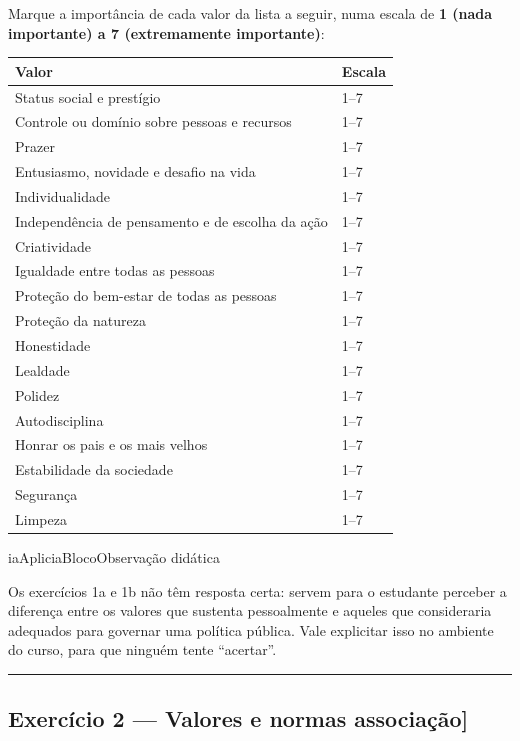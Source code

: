 \documentclass[
  11pt,
]{article}
\renewcommand{\texttt}[1]{{\color{iaAmeixa}\small\ttfamily #1}}
\newenvironment{reflexao}[1][Para pensar]{\begin{iabox}{iaAplic}{iaBloco}{#1}}{\end{iabox}}
\begin{document}
Marque a importância de cada valor da lista a seguir, numa escala de
\textbf{1 (nada importante) a 7 (extremamente importante)}:

\begin{longtable}[]{@{}ll@{}}
\toprule\noalign{}
Valor & Escala \\
\midrule\noalign{}
\endhead
\bottomrule\noalign{}
\endlastfoot
Status social e prestígio & 1--7 \\
Controle ou domínio sobre pessoas e recursos & 1--7 \\
Prazer & 1--7 \\
Entusiasmo, novidade e desafio na vida & 1--7 \\
Individualidade & 1--7 \\
Independência de pensamento e de escolha da ação & 1--7 \\
Criatividade & 1--7 \\
Igualdade entre todas as pessoas & 1--7 \\
Proteção do bem-estar de todas as pessoas & 1--7 \\
Proteção da natureza & 1--7 \\
Honestidade & 1--7 \\
Lealdade & 1--7 \\
Polidez & 1--7 \\
Autodisciplina & 1--7 \\
Honrar os pais e os mais velhos & 1--7 \\
Estabilidade da sociedade & 1--7 \\
Segurança & 1--7 \\
Limpeza & 1--7 \\
\end{longtable}

\begin{reflexao}[Observação didática]

Os exercícios 1a e 1b não têm resposta certa: servem para o estudante
perceber a diferença entre os valores que sustenta pessoalmente e
aqueles que consideraria adequados para governar uma política pública.
Vale explicitar isso no ambiente do curso, para que ninguém tente
``acertar''.

\end{reflexao}

\begin{center}\rule{0.5\linewidth}{0.5pt}\end{center}

\hypertarget{exercuxedcio-2-valores-e-normas-associauxe7uxe3o}{%
\subsection{\texorpdfstring{Exercício 2 --- Valores e normas
\texttt{{[}associação{]}}}{Exercício 2 --- Valores e normas {[}associação{]}}}\label{exercuxedcio-2-valores-e-normas-associauxe7uxe3o}}
\end{document}
